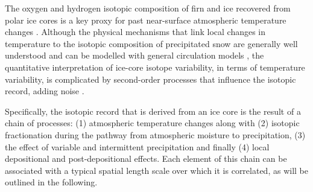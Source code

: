 \documentclass[cp, manuscript]{copernicus}
\begin{document}

\introduction

The oxygen and hydrogen isotopic composition of firn and ice recovered from
polar ice cores is a key proxy for past near-surface atmospheric temperature
changes \citep{Dansgaard1964,Lorius1969,Masson-Delmotte2008,Sjolte2011}.
Although the physical mechanisms that link local changes in temperature to the
isotopic composition of precipitated snow are generally well understood
\citep{Dansgaard1964,Craig1965,Jouzel1984} and can be modelled with general
circulation models
\citep{Joussaume1984,Werner2011,Werner2016,Sjolte2011,Goursaud2018}, the
quantitative interpretation of ice-core isotope variability, in terms of
temperature variability, is complicated by second-order processes that
influence the isotopic record, adding noise \citep{Munch2018a}.

Specifically, the isotopic record that is derived from an ice core is the result
of a chain of processes: (1) atmospheric temperature changes along with (2) isotopic
fractionation during the pathway from atmospheric moisture to precipitation, (3)
the effect of variable and intermittent precipitation and finally (4) local
depositional and post-depositional effects. Each element of this chain can be
associated with a typical spatial length scale over which it is correlated, as
will be outlined in the following.
\end{document}
